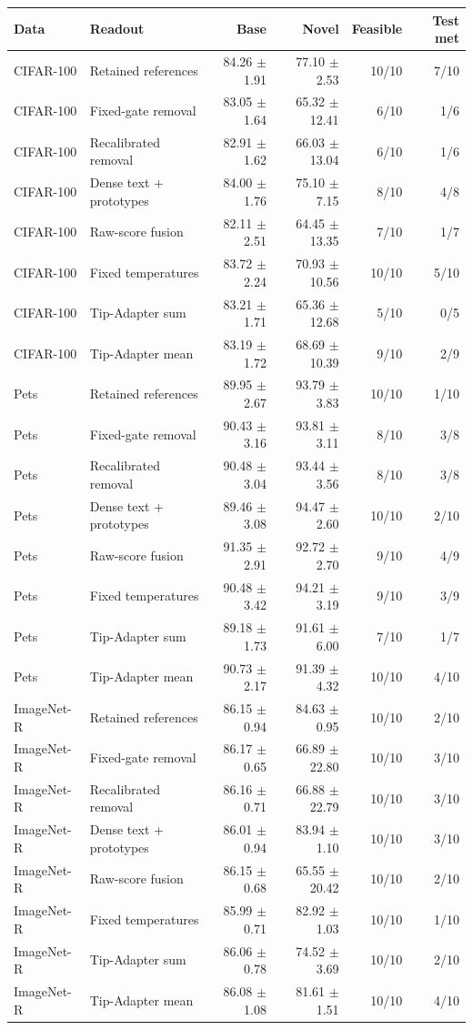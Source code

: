 \begin{tabular}{llrrrr}
\toprule
Data & Readout & Base & Novel & Feasible & Test met \\
\midrule
CIFAR-100 & Retained references & 84.26 $\pm$ 1.91 & 77.10 $\pm$ 2.53 & 10/10 & 7/10 \\
CIFAR-100 & Fixed-gate removal & 83.05 $\pm$ 1.64 & 65.32 $\pm$ 12.41 & 6/10 & 1/6 \\
CIFAR-100 & Recalibrated removal & 82.91 $\pm$ 1.62 & 66.03 $\pm$ 13.04 & 6/10 & 1/6 \\
CIFAR-100 & Dense text + prototypes & 84.00 $\pm$ 1.76 & 75.10 $\pm$ 7.15 & 8/10 & 4/8 \\
CIFAR-100 & Raw-score fusion & 82.11 $\pm$ 2.51 & 64.45 $\pm$ 13.35 & 7/10 & 1/7 \\
CIFAR-100 & Fixed temperatures & 83.72 $\pm$ 2.24 & 70.93 $\pm$ 10.56 & 10/10 & 5/10 \\
CIFAR-100 & Tip-Adapter sum & 83.21 $\pm$ 1.71 & 65.36 $\pm$ 12.68 & 5/10 & 0/5 \\
CIFAR-100 & Tip-Adapter mean & 83.19 $\pm$ 1.72 & 68.69 $\pm$ 10.39 & 9/10 & 2/9 \\
\midrule
Pets & Retained references & 89.95 $\pm$ 2.67 & 93.79 $\pm$ 3.83 & 10/10 & 1/10 \\
Pets & Fixed-gate removal & 90.43 $\pm$ 3.16 & 93.81 $\pm$ 3.11 & 8/10 & 3/8 \\
Pets & Recalibrated removal & 90.48 $\pm$ 3.04 & 93.44 $\pm$ 3.56 & 8/10 & 3/8 \\
Pets & Dense text + prototypes & 89.46 $\pm$ 3.08 & 94.47 $\pm$ 2.60 & 10/10 & 2/10 \\
Pets & Raw-score fusion & 91.35 $\pm$ 2.91 & 92.72 $\pm$ 2.70 & 9/10 & 4/9 \\
Pets & Fixed temperatures & 90.48 $\pm$ 3.42 & 94.21 $\pm$ 3.19 & 9/10 & 3/9 \\
Pets & Tip-Adapter sum & 89.18 $\pm$ 1.73 & 91.61 $\pm$ 6.00 & 7/10 & 1/7 \\
Pets & Tip-Adapter mean & 90.73 $\pm$ 2.17 & 91.39 $\pm$ 4.32 & 10/10 & 4/10 \\
\midrule
ImageNet-R & Retained references & 86.15 $\pm$ 0.94 & 84.63 $\pm$ 0.95 & 10/10 & 2/10 \\
ImageNet-R & Fixed-gate removal & 86.17 $\pm$ 0.65 & 66.89 $\pm$ 22.80 & 10/10 & 3/10 \\
ImageNet-R & Recalibrated removal & 86.16 $\pm$ 0.71 & 66.88 $\pm$ 22.79 & 10/10 & 3/10 \\
ImageNet-R & Dense text + prototypes & 86.01 $\pm$ 0.94 & 83.94 $\pm$ 1.10 & 10/10 & 3/10 \\
ImageNet-R & Raw-score fusion & 86.15 $\pm$ 0.68 & 65.55 $\pm$ 20.42 & 10/10 & 2/10 \\
ImageNet-R & Fixed temperatures & 85.99 $\pm$ 0.71 & 82.92 $\pm$ 1.03 & 10/10 & 1/10 \\
ImageNet-R & Tip-Adapter sum & 86.06 $\pm$ 0.78 & 74.52 $\pm$ 3.69 & 10/10 & 2/10 \\
ImageNet-R & Tip-Adapter mean & 86.08 $\pm$ 1.08 & 81.61 $\pm$ 1.51 & 10/10 & 4/10 \\
\bottomrule
\end{tabular}
